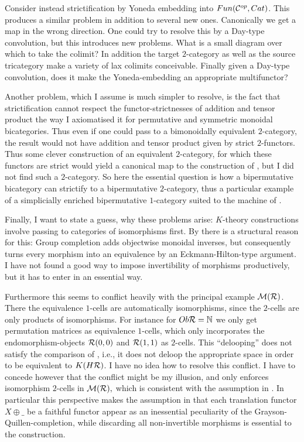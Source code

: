 Consider instead strictification by Yoneda embedding into $Fun(\mathcal{C}^{op},Cat)$. 
This produces a similar problem in addition to several new ones. Canonically we get a
map in the wrong direction. One could try to resolve this by a Day-type
convolution, but this introduces new problems. What is a small
diagram over which to take the colimit? In addition the target 
$2$-category as well as the source tricategory make a variety
of lax colimits conceivable. Finally given a Day-type convolution, 
does it make the Yoneda-embedding an appropriate multifunctor?

Another problem, which I assume is much simpler to resolve, is the fact
that strictification cannot respect the functor-strictnesses of
addition and tensor product the way I axiomatised it for permutative and
symmetric monoidal bicategories. Thus even if one could pass to a 
bimonoidally equivalent $2$-category, the result would not have addition
and tensor product given by strict $2$-functors. Thus some clever 
construction of an equivalent $2$-category, for which these functors are
strict would yield a canonical map to the construction of \cite{EM}, but I did not 
find such a $2$-category. So here the essential question is how a 
bipermutative bicategory can strictify to a bipermutative $2$-category, 
thus a particular example of a simplicially enriched bipermutative 
$1$-category suited to the machine of \cite{EM}.

Finally, I want to state a guess, why these problems arise: 
$K$-theory constructions involve passing to categories of isomorphisms first. 
By \cite[Proposition 8.14]{GGN} there is a structural reason for this: 
Group completion adds objectwise monoidal inverses,
but consequently turns every morphism into an equivalence by an Eckmann-Hilton-type argument.
I have not found a good way to impose
invertibility of morphisms productively, but it has to enter in an essential way.

Furthermore this seems to conflict heavily with the principal example $\mathcal{M}(\mathcal{R})$. There the equivalence
$1$-cells are automatically isomorphisms, since the $2$-cells are only products
of isomorphisms. For instance for $Ob\mathcal{R} = \mathbb{N}$ we only get permutation
matrices as equivalence $1$-cells, which only incorporates the endomorphism-objects 
$\mathcal{R}(0,0)$ and $\mathcal{R}(1,1)$ as $2$-cells. This ``delooping'' does not
satisfy the comparison of \cite{BDRR2011}, i.e., it does not deloop the appropriate
space in order to be equivalent to $K(H\mathcal{R})$. I have no idea how to resolve this
conflict. I have to concede however
that the conflict might be my illusion, and \cite[Proposition 8.14]{GGN} only enforces
isomorphism $2$-cells in $\mathcal{M}(\mathcal{R}),$ which is consistent with the assumption in
\cite{BDRR2011}. In particular this perspective makes the assumption in
\cite{BDRR2011} that each translation functor $X\oplus\_$ be a faithful functor
appear as an inessential peculiarity of the Grayson-Quillen-completion,
while discarding all non-invertible morphisms is essential to the construction.

